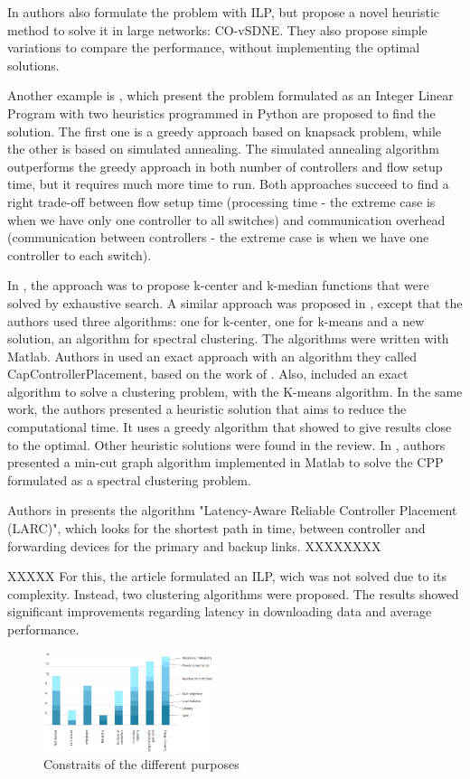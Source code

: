 \documentclass{IEEEtran}
\newcommand\delia[1]{{\tiny{\color{red}#1}}} %
\begin{document}
In \cite{GoGi17} authors also formulate the problem with ILP, but propose a novel heuristic method to solve it in large networks: CO-vSDNE. They also propose simple variations to compare the performance, without implementing the optimal solutions. 

Another example is \cite{BaRo13}, which present the problem formulated as an Integer Linear Program with two heuristics programmed in Python are proposed to find the solution. The first one is a greedy approach based on knapsack problem, while the other is based on simulated annealing. The simulated annealing algorithm outperforms the greedy approach in both number of controllers and flow setup time, but it requires much more time to run. Both approaches succeed to find a right trade-off between flow setup time (processing time - the extreme case is when we have only one controller to all switches) and communication overhead (communication between controllers - the extreme case is when we have one controller to each switch). 


In \cite{HeSh12}, the approach was to propose k-center and k-median functions that were solved by exhaustive search. A similar approach was proposed in \cite{SaSa16}, except that the authors used three algorithms: one for k-center, one for k-means and a new solution, an algorithm for spectral clustering. The algorithms were written with Matlab. Authors in \cite{YaBi14} used an exact approach with an algorithm they called CapControllerPlacement, based on the work of  \cite{OzPi06}. Also, \cite{LiJia16} included an exact algorithm to solve a clustering problem, with the K-means algorithm. In the same work, the authors presented a heuristic solution that aims to reduce the computational time. It uses a greedy algorithm that showed to give results close to the optimal.
Other heuristic solutions were found in the review. In \cite{XiQu14}, authors presented a min-cut graph algorithm implemented in Matlab to solve the CPP formulated as a spectral clustering problem. 


Authors in \cite{FaXi18} presents the algorithm "Latency-Aware Reliable Controller Placement (LARC)", which looks for the shortest path in time, between controller and forwarding devices for the primary and backup links. XXXXXXXX %



XXXXX\cite{AlAy17} For this, the article formulated an ILP, wich was not solved due to its complexity. Instead, two clustering algorithms were proposed. The results showed significant improvements regarding latency in downloading data and average performance.


\begin{figure}
    \centering
    \includegraphics[width=0.45\textwidth]{Pictures/fig2.png}
    \caption{Constraits of the different \delia{purposes} }
    \label{fig:constraint_purposes}
\end{figure}
\end{document}

